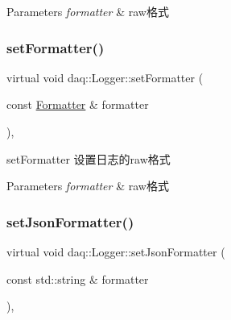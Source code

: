 \begin{DoxyParams}{Parameters}
{\em formatter} & raw格式 \\
\hline
\end{DoxyParams}
\mbox{\label{classdaq_1_1Logger_a23d83680637cd9d67ea9d2e039f38176}} 
\subsubsection{\texorpdfstring{set\+Formatter()}{setFormatter()}\hspace{0.1cm}{\footnotesize\ttfamily [2/2]}}
{\footnotesize\ttfamily virtual void daq\+::\+Logger\+::set\+Formatter (\begin{DoxyParamCaption}\item[{const \hyperlink{classdaq_1_1Formatter}{Formatter} \&}]{formatter }\end{DoxyParamCaption})\hspace{0.3cm}{\ttfamily [inline]}, {\ttfamily [virtual]}}



set\+Formatter 设置日志的raw格式 


\begin{DoxyParams}{Parameters}
{\em formatter} & raw格式 \\
\hline
\end{DoxyParams}
\mbox{\label{classdaq_1_1Logger_a1c3bc00ae27695474c7f054bdabc67c8}} 
\subsubsection{\texorpdfstring{set\+Json\+Formatter()}{setJsonFormatter()}\hspace{0.1cm}{\footnotesize\ttfamily [1/2]}}
{\footnotesize\ttfamily virtual void daq\+::\+Logger\+::set\+Json\+Formatter (\begin{DoxyParamCaption}\item[{const std\+::string \&}]{formatter }\end{DoxyParamCaption})\hspace{0.3cm}{\ttfamily [inline]}, {\ttfamily [virtual]}}



